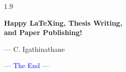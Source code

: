 \documentclass[phd]{ndsu-thesis-2022}
\newcommand\myspacing{1.9}      %
\newcommand\italk[1]{\textcolor{blue}{#1}}  %
\begin{document}
\begin{spacing}{\myspacing}
\vspace{1cm}
\begin{center}
{\LARGE\bfseries
Happy {\LaTeX}ing, Thesis Writing, \\
and Paper Publishing!
}
\end{center}

\hfill {\footnotesize --- C. Igathinathane}
\closeappendices

\vspace{0.5in}
\begin{center}
\italk{--- The End ---}
\end{center}

\end{spacing}
\end{document}
